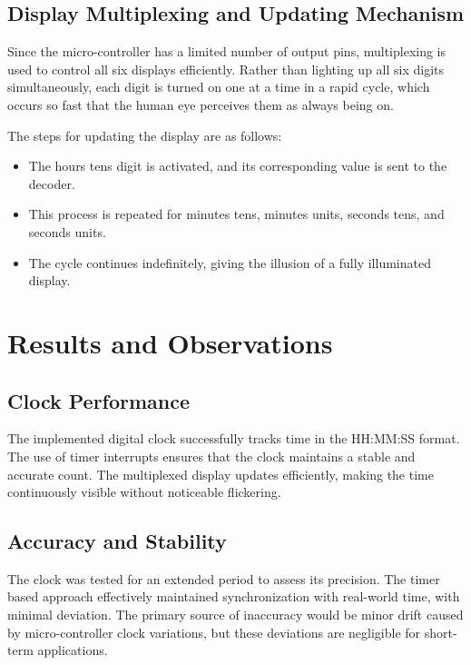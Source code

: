 \documentclass{article}
\theoremstyle{remark}
\begin{document}
\subsection{Display Multiplexing and Updating Mechanism}

Since the micro-controller has a limited number of output pins, multiplexing is used to control all six displays efficiently. Rather than lighting up all six digits simultaneously, each digit is turned on one at a time in a rapid cycle, which occurs so fast that the human eye perceives them as always being on.

\newpage

The steps for updating the display are as follows:

\begin{itemize}
    \item The hours tens digit is activated, and its corresponding value is sent to the decoder.
    \item This process is repeated for minutes tens, minutes units, seconds tens, and seconds units.
    \item The cycle continues indefinitely, giving the illusion of a fully illuminated display.
\end{itemize}


\section{Results and Observations}

\subsection{Clock Performance}
The implemented digital clock successfully tracks time in the HH:MM:SS format. The use of timer interrupts ensures that the clock maintains a stable and accurate count. The multiplexed display updates efficiently, making the time continuously visible without noticeable flickering.

\subsection{Accuracy and Stability}
The clock was tested for an extended period to assess its precision. The timer based approach effectively maintained synchronization with real-world time, with minimal deviation. The primary source of inaccuracy would be minor drift caused by micro-controller clock variations, but these deviations are negligible for short-term applications.
\end{document}

